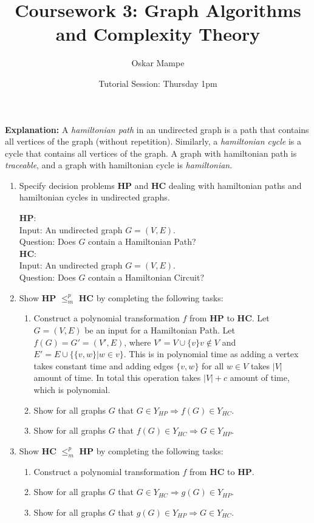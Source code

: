 \documentclass[11pt,a4paper]{article}
\title{Coursework 3: Graph Algorithms and Complexity Theory}
\author{Oskar Mampe}
\date{Tutorial Session: Thursday 1pm}
\begin{document}
\maketitle
\thispagestyle{empty}

\textbf{Explanation: } A \textit{hamiltonian path} in an undirected graph is a path that contains all vertices of the graph (without repetition).  Similarly, a \textit{hamiltonian cycle} is a cycle that contains all vertices of the graph.  A graph with hamiltonian path is \textit{traceable}, and a graph with hamiltonian cycle is \textit{hamiltonian}.

\begin{enumerate}
    \item Specify decision problems \textbf{HP} and \textbf{HC} dealing with hamiltonian paths and hamiltonian cycles in undirected graphs.
    
    \textbf{HP}:\\ Input: An undirected graph $G = (V, E)$.\\ Question: Does $G$ contain a Hamiltonian Path?\\


    \textbf{HC}:\\ Input: An undirected graph $G = (V, E)$.\\ Question: Does $G$ contain a Hamiltonian Circuit?\\

    \item Show \textbf{HP} $\leq^p_m$ \textbf{HC} by completing the following tasks: 
        \begin{enumerate}
            \item Construct a polynomial transformation $f$ from \textbf{HP} to \textbf{HC}.
            Let $G = (V, E)$ be an input for a Hamiltonian Path. Let $f(G) = G'  = (V', E)$, where $V' = V \cup \{v\} v \notin V$ and $E' = E \cup \{ \{ v, w\} | w \in v\}$. This is in polynomial time as adding a vertex takes constant time and adding edges $\{v, w \}$ for all $w \in V$ takes $|V|$ amount of time. In total this operation takes $|V| + c$ amount of time, which is polynomial. 
            \item Show for all graphs $G$ that $G \in Y_{HP} \Rightarrow f(G) \in Y_{HC}$. 
            
            \item Show for all graphs $G$ that $f(G) \in Y_{HC} \Rightarrow G \in Y_{HP}$.
            
        \end{enumerate}
    \item Show \textbf{HC} $\leq^p_m$ \textbf{HP} by completing the following tasks: 
    \begin{enumerate}
        \item Construct a polynomial transformation $f$ from \textbf{HC} to \textbf{HP}.
        \item Show for all graphs $G$ that $G \in Y_{HC} \Rightarrow g(G) \in Y_{HP}$.
        \item Show for all graphs $G$ that $g(G) \in Y_{HP} \Rightarrow G \in Y_{HC}$.
    \end{enumerate}
\end{enumerate}
\end{document}
